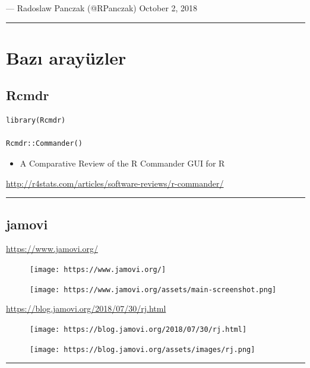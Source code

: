 \documentclass[]{article}
\providecommand{\tightlist}{%
  \setlength{\itemsep}{0pt}\setlength{\parskip}{0pt}}
\begin{document}
--- Radoslaw Panczak (@RPanczak) October 2, 2018

\begin{center}\rule{0.5\linewidth}{\linethickness}\end{center}

\hypertarget{bazi-arayuzler}{%
\section{Bazı arayüzler}\label{bazi-arayuzler}}

\hypertarget{rcmdr}{%
\subsection{Rcmdr}\label{rcmdr}}

\begin{verbatim}
library(Rcmdr)

Rcmdr::Commander()
\end{verbatim}

\begin{itemize}
\tightlist
\item
  A Comparative Review of the R Commander GUI for R
\end{itemize}

\url{http://r4stats.com/articles/software-reviews/r-commander/}

\begin{center}\rule{0.5\linewidth}{\linethickness}\end{center}

\hypertarget{jamovi}{%
\subsection{jamovi}\label{jamovi}}

\url{https://www.jamovi.org/}

\begin{figure}
\centering
\texttt{[image: https://www.jamovi.org/]}
\caption{\texttt{[image: https://www.jamovi.org/assets/main-screenshot.png]}}
\end{figure}

\url{https://blog.jamovi.org/2018/07/30/rj.html}

\begin{figure}
\centering
\texttt{[image: https://blog.jamovi.org/2018/07/30/rj.html]}
\caption{\texttt{[image: https://blog.jamovi.org/assets/images/rj.png]}}
\end{figure}

\begin{center}\rule{0.5\linewidth}{\linethickness}\end{center}
\end{document}

